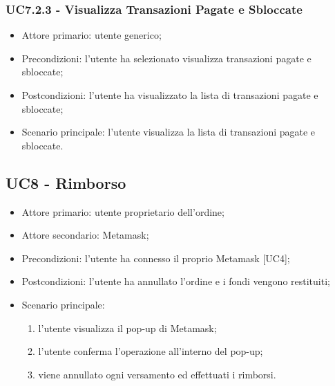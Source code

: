 \subsubsection{UC7.2.3 - Visualizza Transazioni Pagate e Sbloccate}

\begin{itemize}
    \item Attore primario: utente generico;
    \item Precondizioni: l'utente ha selezionato visualizza transazioni pagate e sbloccate;
    \item Postcondizioni: l'utente ha visualizzato la lista di transazioni pagate e sbloccate;
    \item Scenario principale: l'utente visualizza la lista di transazioni pagate e sbloccate.
\end{itemize}

\subsection{UC8 - Rimborso}


\begin{itemize}
    \item Attore primario: utente proprietario dell'ordine;
    \item Attore secondario: Metamask;
    \item Precondizioni: l'utente ha connesso il proprio Metamask [UC4];
    \item Postcondizioni: l'utente ha annullato l'ordine e i fondi vengono restituiti;
    \item Scenario principale:
    \begin{enumerate}
        \item l'utente visualizza il pop-up di Metamask;
        \item l'utente conferma l'operazione all'interno del pop-up;
        \item viene annullato ogni versamento ed effettuati i rimborsi.
    \end{enumerate}
    \end{itemize}


\clearpage
